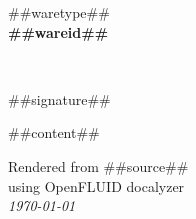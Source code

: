 \documentclass{##docstyle##}
\begin{document}
\begin{center}
  {##waretype##}\\
  \vspace{0.8em}
  {\huge \bfseries ##wareid##}\\
\end{center}\\
\vspace{1.5em}

##signature##

\vspace{1.5em}

##content##

\vspace{3em}

\begin{small}
\begin{flushright}Rendered from ##source##\\
using OpenFLUID docalyzer\\
\textit{\today}
\end{flushright}
\end{small}
\end{document}

